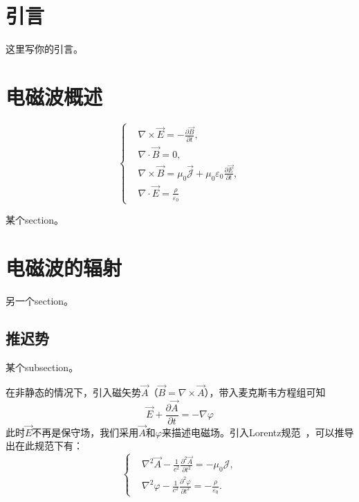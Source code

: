 \documentclass[a4paper,11pt,onecolumn,twoside]{article}
\begin{document}
\begin{multicols}{2}



\section{引言}

这里写你的引言。


\section{电磁波概述}

\begin{equation}
\left\{
\begin{aligned}
& \nabla \times \vec{E} = -\frac{\partial \vec{B}}{\partial t}, \\
& \nabla \cdot \vec{B} = 0, \\
& \nabla \times \vec{B} = \mu_0 \vec{\mathcal J} + \mu_0\varepsilon_0\frac{\partial \vec{E}}{\partial t}, \\
& \nabla \cdot \vec{E} = \frac{\rho}{\varepsilon_0}
\end{aligned}
\right.
\label{maxwell}
\end{equation}

某个section。


\section{电磁波的辐射}

另一个section。

\subsection{推迟势}

某个subsection。

在非静态的情况下，引入磁矢势$\vec{A}$（$\vec{B} = \nabla \times \vec{A}$），带入麦克斯韦方程组可知
\begin{equation}
\vec{E} + \frac{\partial \vec{A}}{\partial t} = - \nabla \varphi
\end{equation}
此时$\vec{E}$不再是保守场，我们采用$\vec{A}$和$\varphi$来描述电磁场。引入Lorentz规范~\supercite{Elecbook}，可以推导出在此规范下有：
\begin{equation}
\left\{
\begin{aligned}
& \nabla^2 \vec{A} - \frac{1}{c^2} \frac{\partial^2 \vec{A}}{\partial t^2} = -\mu_0 \mathcal{J}, \\
& \nabla^2 \varphi - \frac{1}{c^2} \frac{\partial^2 \varphi}{\partial t^2} = -\frac{\rho}{\varepsilon_0}.
\end{aligned}
\right.
\label{dbert}
\end{equation}


\end{multicols}
\end{document}
